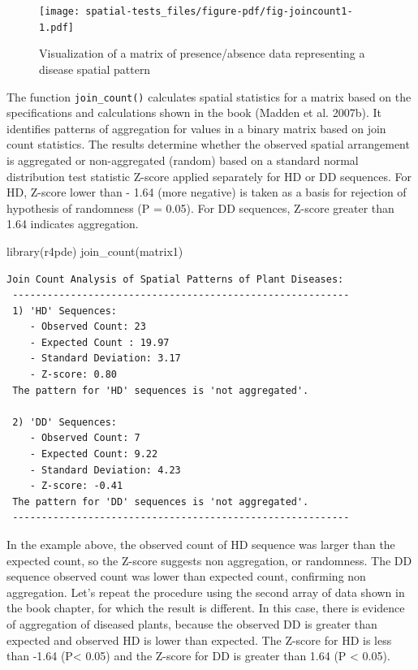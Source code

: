 \documentclass[
  letterpaper,
]{book}
\newenvironment{Shaded}{\begin{snugshade}}{\end{snugshade}}
\newcommand{\FunctionTok}[1]{\textcolor[rgb]{0.28,0.35,0.67}{#1}}
\newcommand{\NormalTok}[1]{\textcolor[rgb]{0.00,0.23,0.31}{#1}}
\begin{document}
\begin{figure}[H]

{\centering \texttt{[image: spatial-tests\_files/figure-pdf/fig-joincount1-1.pdf]}

}

\caption{\label{fig-joincount1}Visualization of a matrix of
presence/absence data representing a disease spatial pattern}

\end{figure}

The function \texttt{join\_count()} calculates spatial statistics for a
matrix based on the specifications and calculations shown in the book
(Madden et al. 2007b). It identifies patterns of aggregation for values
in a binary matrix based on join count statistics. The results determine
whether the observed spatial arrangement is aggregated or non-aggregated
(random) based on a standard normal distribution test statistic Z-score
applied separately for HD or DD sequences. For HD, Z-score lower than -
1.64 (more negative) is taken as a basis for rejection of hypothesis of
randomness (P = 0.05). For DD sequences, Z-score greater than 1.64
indicates aggregation.

\begin{Shaded}
\begin{Highlighting}[]
\FunctionTok{library}\NormalTok{(r4pde)}
\FunctionTok{join\_count}\NormalTok{(matrix1)}
\end{Highlighting}
\end{Shaded}

\begin{verbatim}
Join Count Analysis of Spatial Patterns of Plant Diseases:
 ----------------------------------------------------------
 1) 'HD' Sequences:
    - Observed Count: 23
    - Expected Count : 19.97
    - Standard Deviation: 3.17
    - Z-score: 0.80
 The pattern for 'HD' sequences is 'not aggregated'.

 2) 'DD' Sequences:
    - Observed Count: 7
    - Expected Count: 9.22
    - Standard Deviation: 4.23
    - Z-score: -0.41
 The pattern for 'DD' sequences is 'not aggregated'.
 ----------------------------------------------------------
\end{verbatim}

In the example above, the observed count of HD sequence was larger than
the expected count, so the Z-score suggests non aggregation, or
randomness. The DD sequence observed count was lower than expected
count, confirming non aggregation. Let's repeat the procedure using the
second array of data shown in the book chapter, for which the result is
different. In this case, there is evidence of aggregation of diseased
plants, because the observed DD is greater than expected and observed HD
is lower than expected. The Z-score for HD is less than -1.64
(P\textless{} 0.05) and the Z-score for DD is greater than 1.64 (P
\textless{} 0.05).
\end{document}
